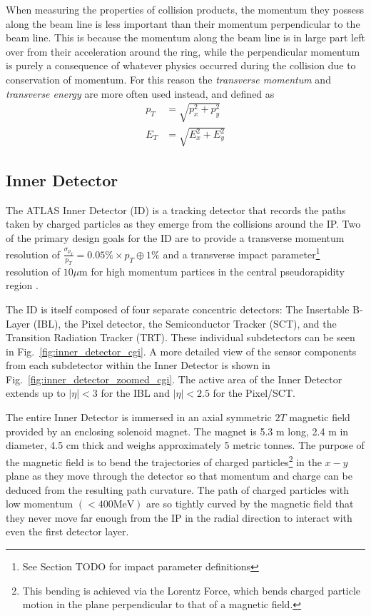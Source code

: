 When measuring the properties of collision products, the momentum they possess along the beam line is less important than their momentum perpendicular to the beam line. This is because the momentum along the beam line is in large part left over from their acceleration around the ring, while the perpendicular momentum is purely a consequence of whatever physics occurred during the collision due to conservation of momentum.
For this reason the \textit{transverse momentum} and \textit{transverse energy} are more often used instead, and defined as
\begin{align}
p_T &= \sqrt{p_x^2 + p_y^2} \\
E_T &= \sqrt{E_x^2 + E_y^2}
\label{eqn:transverse_momentum_energy}
\end{align}

\subsection{Inner Detector}
\label{sec:inner_detector}
The ATLAS Inner Detector (ID) \cite{CERN-LHCC-97-016} \cite{ATLAS-TDR-2008} is a tracking detector that records the paths taken by charged particles as they emerge from the collisions around the IP.
Two of the primary design goals for the ID are to provide a transverse momentum resolution of $\frac{\sigma_{p_T}}{p_T} = 0.05\% \times p_T \oplus 1\%$ and a transverse impact parameter\footnote{See Section TODO for impact parameter definitions} resolution of $10 \mu$m for high momentum partices in the central pseudorapidity region \cite{ATLAS-TDR-2008}.

The ID is itself composed of four separate concentric detectors: The Insertable B-Layer (IBL), the Pixel detector, the Semiconductor Tracker (SCT), and the Transition Radiation Tracker (TRT).
These individual subdetectors can be seen in Fig.~\ref{fig:inner_detector_cgi}.
A more detailed view of the sensor components from each subdetector within the Inner Detector is shown in Fig.~\ref{fig:inner_detector_zoomed_cgi}.
The active area of the Inner Detector extends up to $|\eta| < 3$ for the IBL and $|\eta| < 2.5$ for the Pixel/SCT.

The entire Inner Detector is immersed in an axial symmetric $2T$ magnetic field provided by an enclosing solenoid magnet.
The magnet is 5.3 m long, 2.4 m in diameter, 4.5 cm thick and weighs approximately 5 metric tonnes.
The purpose of the magnetic field is to bend the trajectories of charged particles\footnote{This bending is achieved via the Lorentz Force, which bends charged particle motion in the plane perpendicular to that of a magnetic field.} in the $x-y$ plane as they move through the detector so that momentum and charge can be deduced from the resulting path curvature.
The path of charged particles with low momentum $(< 400 \mathrm{MeV})$ are so tightly curved by the magnetic field that they never move far enough from the IP in the radial direction to interact with even the first detector layer.

